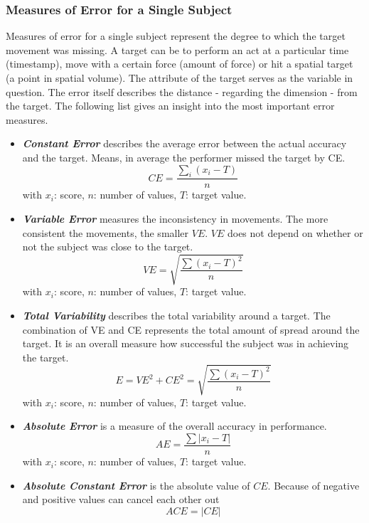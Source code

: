 \subsubsection{Measures of Error for a Single Subject}
Measures of error for a single subject represent the degree to which the target movement was missing. A target can be to perform an act at a particular time (timestamp), move with a certain force (amount of force) or hit a spatial target (a point in spatial volume). The attribute of the target serves as the variable in question. The error itself describes the distance - regarding the dimension - from the target. The following list gives an insight into the most important error measures.
\begin{itemize}
	\item \textbf{\textit{Constant Error}} describes the average error between the actual accuracy and the target. Means, in average the performer missed the target by CE.
	\begin{equation}
	CE=\frac{\sum_i(x_i-T)}{n}
	\end{equation}
	\label{eq:constanterror}
	with $x_i$: score, $n$: number of values, $T$: target value.
	\item \textbf{\textit{Variable Error}} measures the inconsistency in movements. The more consistent the movements, the smaller $VE$. $VE$ does not depend on whether or not the subject was close to the target.
	\begin{equation}
	VE=\sqrt{\frac{\sum(x_i-T)^2}{n}}    
	\end{equation}
	with $x_i$: score, $n$: number of values, $T$: target value.
	\item \textbf{\textit{Total Variability}} describes the total variability around a target. The combination of VE and CE represents the total amount of spread around the target. It is an overall measure how successful the subject was in achieving the target.
	\begin{equation}
	E=VE^2+CE^2=\sqrt{\frac{\sum(x_i-T)^2}{n}}
	\end{equation}
	with $x_i$: score, $n$: number of values, $T$: target value.
	\item \textbf{\textit{Absolute Error}} is a measure of the overall accuracy in performance.
	\begin{equation}
	AE=\frac{\sum|x_i-T|}{n}
	\end{equation}
	with $x_i$: score, $n$: number of values, $T$: target value.
	\item \textbf{\textit{Absolute Constant Error}} is the absolute value of $CE$. Because of negative and positive values can cancel each other out
	\begin{equation}
	ACE = |CE|
	\end{equation}
\end{itemize}



